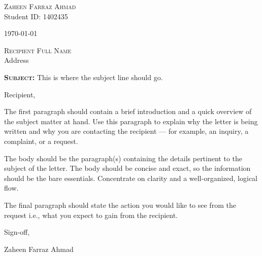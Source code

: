 \documentclass[10pt]{article}
\begin{document}
\raggedright

\hfill
\begin{minipage}{0.3\textwidth}
    \raggedright
    {\large\textsc{Zaheen Farraz Ahmad}}\\
    Student ID: 1402435\\

    \vspace{1em}

    \today
\end{minipage}
\vspace{4em}

\textsc{Recipient Full Name}\\
Address
\vspace{1em}

\textbf{\textsc{Subject:}} This is where the subject line should go.
\vspace{1em}

Recipient,

The first paragraph should contain a brief introduction and a quick overview of
the subject matter at hand. Use this paragraph to explain why the letter is
being written and why you are contacting the recipient --- for example, an
inquiry, a complaint, or a request.

The body should be the paragraph(s) containing the details pertinent to the
subject of the letter. The body should be concise and exact, so the information
should be the bare essentials. Concentrate on clarity and a well-organized,
logical flow.

The final paragraph should state the action you would like to see from the
request i.e., what you expect to gain from the recipient.


\vspace{2em}

Sign-off,

\vspace{6em}

Zaheen Farraz Ahmad
\end{document}
